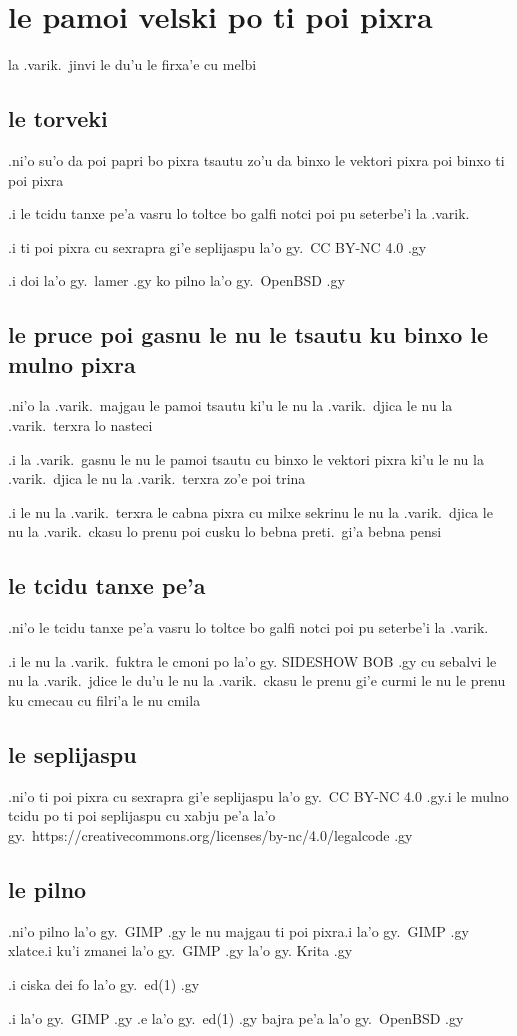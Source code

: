 \documentclass{report}
\begin{document}
\section{le pamoi velski po ti poi pixra}
la .varik.\ jinvi le du'u le firxa'e cu melbi
\subsection{le torveki}
.ni'o su'o da poi papri bo pixra tsautu zo'u da binxo le vektori pixra poi binxo ti poi pixra

.i le tcidu tanxe pe'a vasru lo toltce bo galfi notci poi pu seterbe'i la .varik.

.i ti poi pixra cu sexrapra gi'e seplijaspu la'o gy.\ CC BY-NC 4.0 .gy

.i doi la'o gy.\ lamer .gy ko pilno la'o gy.\ OpenBSD .gy
\subsection{le pruce poi gasnu le nu le tsautu ku binxo le mulno pixra}
.ni'o la .varik.\ majgau le pamoi tsautu ki'u le nu la .varik.\ djica le nu la .varik.\ terxra lo nasteci

.i la .varik.\ gasnu le nu le pamoi tsautu cu binxo le vektori pixra ki'u le nu la .varik.\ djica le nu la .varik.\ terxra zo'e poi trina

.i le nu la .varik.\ terxra le cabna pixra cu milxe sekrinu le nu la .varik.\ djica le nu la .varik.\ ckasu lo prenu poi cusku lo bebna preti.\ gi'a bebna pensi
\subsection{le tcidu tanxe pe'a}
.ni'o le tcidu tanxe pe'a vasru lo toltce bo galfi notci poi pu seterbe'i la .varik.

.i le nu la .varik.\ fuktra le cmoni po la'o gy. SIDESHOW BOB .gy cu sebalvi le nu la .varik.\ jdice le du'u le nu la .varik.\ ckasu le prenu gi'e curmi le nu le prenu ku cmecau cu filri'a le nu cmila
\subsection{le seplijaspu}
.ni'o ti poi pixra cu sexrapra gi'e seplijaspu la'o gy.\ CC BY-NC 4.0 .gy\@ .i le mulno tcidu po ti poi seplijaspu cu xabju pe'a la'o gy.\ https://creativecommons.org/licenses/by-nc/4.0/legalcode .gy
\subsection{le pilno}
.ni'o pilno la'o gy.\ GIMP .gy le nu majgau ti poi pixra\@ .i  la'o gy.\ GIMP .gy xlatce\@ .i ku'i zmanei la'o gy.\ GIMP .gy la'o gy. Krita .gy

.i ciska dei fo la'o gy.\ ed(1) .gy

.i la'o gy.\ GIMP .gy .e la'o gy.\ ed(1) .gy bajra pe'a la'o gy.\ OpenBSD .gy
\end{document}
